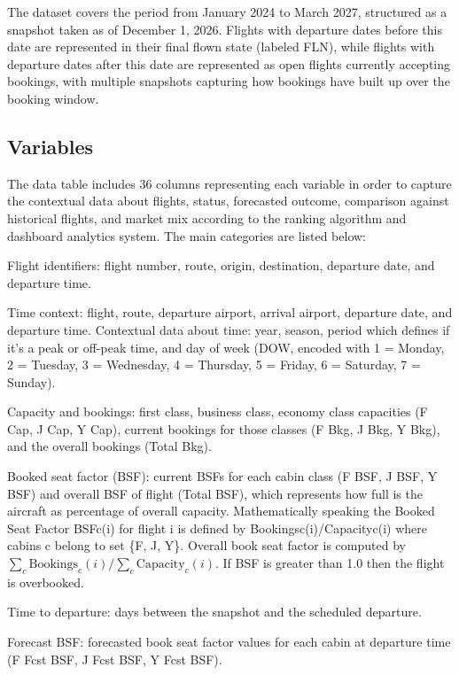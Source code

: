 The dataset covers the period from January 2024 to March 2027, structured as a snapshot taken as of December 1, 2026. Flights with departure dates before this date are represented in their final flown state (labeled FLN), while flights with departure dates after this date are represented as open flights currently accepting bookings, with multiple snapshots capturing how bookings have built up over the booking window.

\subsection{Variables}

The data table includes 36 columns representing each variable in order to capture the contextual data about flights, status, forecasted outcome, comparison against historical flights, and market mix according to the ranking algorithm and dashboard analytics system. The main categories are listed below:

Flight identifiers: flight number, route, origin, destination, departure date, and departure time.

Time context: flight, route, departure airport, arrival airport, departure date, and departure time. Contextual data about time: year, season, period which defines if it's a peak or off-peak time, and day of week (DOW, encoded with 1 = Monday, 2 = Tuesday, 3 = Wednesday, 4 = Thursday, 5 = Friday, 6 = Saturday, 7 = Sunday).

Capacity and bookings: first class, business class, economy class capacities (F Cap, J Cap, Y Cap), current bookings for those classes (F Bkg, J Bkg, Y Bkg), and the overall bookings (Total Bkg).

Booked seat factor (BSF): current BSFs for each cabin class (F BSF, J BSF, Y BSF) and overall BSF of flight (Total BSF), which represents how full is the aircraft as percentage of overall capacity. Mathematically speaking the Booked Seat Factor BSFc(i) for flight i is defined by Bookingsc(i)/Capacityc(i) where cabins c belong to set \{F, J, Y\}. Overall book seat factor is computed by $\sum_{c} \text{Bookings}_c(i) / \sum_{c} \text{Capacity}_c(i)$. If BSF is greater than 1.0 then the flight is overbooked.

Time to departure: days between the snapshot and the scheduled departure.

Forecast BSF: forecasted book seat factor values for each cabin at departure time (F Fcst BSF, J Fcst BSF, Y Fcst BSF).

